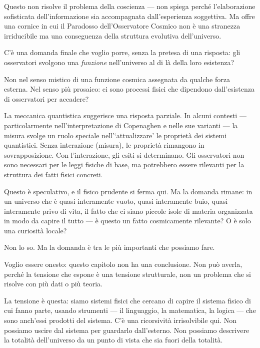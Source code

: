 \documentclass[12pt,a4paper,openany]{book}
\newcommand{\sezione}[1]{\vspace{1.2em}{\large\bfseries #1}\vspace{0.5em}\par}
\begin{document}
Questo non risolve il problema della coscienza --- non spiega perché l'elaborazione sofisticata dell'informazione sia accompagnata dall'esperienza soggettiva. Ma offre una cornice in cui il Paradosso dell'Osservatore Cosmico non è una stranezza irriducibile ma una conseguenza della struttura evolutiva dell'universo.

\sezione{La funzione dell'osservatore}

C'è una domanda finale che voglio porre, senza la pretesa di una risposta: gli osservatori svolgono una \textit{funzione} nell'universo al di là della loro esistenza?

Non nel senso mistico di una funzione cosmica assegnata da qualche forza esterna. Nel senso più prosaico: ci sono processi fisici che dipendono dall'esistenza di osservatori per accadere?

La meccanica quantistica suggerisce una risposta parziale. In alcuni contesti --- particolarmente nell'interpretazione di Copenaghen e nelle sue varianti --- la misura svolge un ruolo speciale nell'`attualizzare' le proprietà dei sistemi quantistici. Senza interazione (misura), le proprietà rimangono in sovrapposizione. Con l'interazione, gli esiti si determinano. Gli osservatori non sono necessari per le leggi fisiche di base, ma potrebbero essere rilevanti per la struttura dei fatti fisici concreti.

Questo è speculativo, e il fisico prudente si ferma qui. Ma la domanda rimane: in un universo che è quasi interamente vuoto, quasi interamente buio, quasi interamente privo di vita, il fatto che ci siano piccole isole di materia organizzata in modo da capire il tutto --- è questo un fatto cosmicamente rilevante? O è solo una curiosità locale?

Non lo so. Ma la domanda è tra le più importanti che possiamo fare.

\sezione{La tensione irrisolta}

Voglio essere onesto: questo capitolo non ha una conclusione. Non può averla, perché la tensione che espone è una tensione strutturale, non un problema che si risolve con più dati o più teoria.

La tensione è questa: siamo sistemi fisici che cercano di capire il sistema fisico di cui fanno parte, usando strumenti --- il linguaggio, la matematica, la logica --- che sono anch'essi prodotti del sistema. C'è una ricorsività irrisolvibile qui. Non possiamo uscire dal sistema per guardarlo dall'esterno. Non possiamo descrivere la totalità dell'universo da un punto di vista che sia fuori della totalità.
\end{document}
